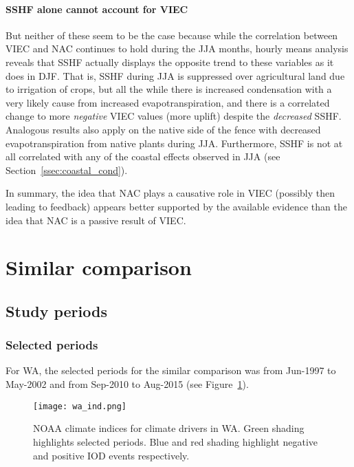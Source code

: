 \paragraph{SSHF alone cannot account for VIEC}

But neither of these seem to be the case because while the correlation between \ac{VIEC} and \ac{NAC} continues to hold during the \ac{JJA} months, hourly means analysis reveals that \ac{SSHF} actually displays the opposite trend to these variables as it does in \ac{DJF}. That is, \ac{SSHF} during \ac{JJA} is suppressed over agricultural land due to irrigation of crops, but all the while there is increased condensation with a very likely cause from increased evapotranspiration, and there is a correlated change to more \textit{negative} \ac{VIEC} values (more uplift) despite the \textit{decreased} \ac{SSHF}. Analogous results also apply on the native side of the fence with decreased evapotranspiration from native plants during \ac{JJA}. Furthermore, \ac{SSHF} is not at all correlated with any of the coastal effects observed in \ac{JJA} (see Section~\ref{ssec:coastal_cond}).

In summary, the idea that \ac{NAC} plays a causative role in \ac{VIEC} (possibly then leading to feedback) appears better supported by the available evidence than the idea that \ac{NAC} is a passive result of \ac{VIEC}.

\section{Similar comparison}

\subsection{Study periods}

\subsubsection{Selected periods}

For \ac{WA}, the selected periods for the similar comparison was from Jun-1997 to May-2002 and from Sep-2010 to Aug-2015 (see Figure~\ref{fig:wa_ind}). 

\begin{figure}[!ht]
	\centering
	\texttt{[image: wa\_ind.png]}
	\caption[WA's relevant climate indices for similar comparison]{\ac{NOAA} climate indices for climate drivers in \ac{WA}. Green shading highlights selected periods. Blue and red shading highlight negative and positive \ac{IOD} events respectively.}
	\label{fig:wa_ind}
\end{figure}

